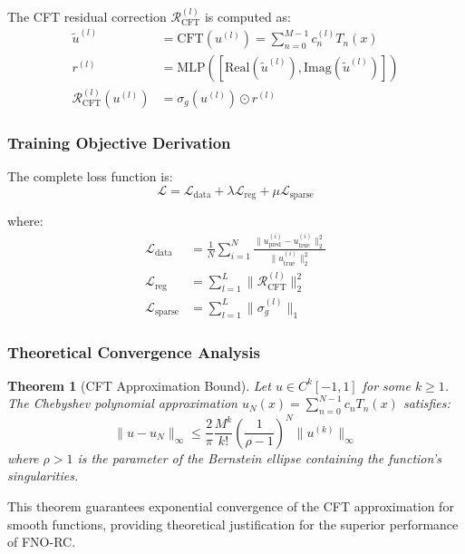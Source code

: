 \documentclass[11pt,twocolumn]{article}
\newtheorem{theorem}{Theorem}
\begin{document}
The CFT residual correction $\mathcal{R}_{\text{CFT}}^{(l)}$ is computed as:
\begin{align}
\tilde{u}^{(l)} &= \text{CFT}(u^{(l)}) = \sum_{n=0}^{M-1} c_n^{(l)} T_n(x) \\
r^{(l)} &= \text{MLP}\left( [\text{Real}(\tilde{u}^{(l)}), \text{Imag}(\tilde{u}^{(l)})] \right) \\
\mathcal{R}_{\text{CFT}}^{(l)}(u^{(l)}) &= \sigma_g(u^{(l)}) \odot r^{(l)}
\end{align}

\subsubsection{Training Objective Derivation}

The complete loss function is:
\begin{equation}
\mathcal{L} = \mathcal{L}_{\text{data}} + \lambda \mathcal{L}_{\text{reg}} + \mu \mathcal{L}_{\text{sparse}}
\end{equation}

where:
\begin{align}
\mathcal{L}_{\text{data}} &= \frac{1}{N} \sum_{i=1}^{N} \frac{\|u_{\text{pred}}^{(i)} - u_{\text{true}}^{(i)}\|_2^2}{\|u_{\text{true}}^{(i)}\|_2^2} \\
\mathcal{L}_{\text{reg}} &= \sum_{l=1}^{L} \|\mathcal{R}_{\text{CFT}}^{(l)}\|_2^2 \\
\mathcal{L}_{\text{sparse}} &= \sum_{l=1}^{L} \|\sigma_g^{(l)}\|_1
\end{align}

\subsubsection{Theoretical Convergence Analysis}

\begin{theorem}[CFT Approximation Bound]
Let $u \in C^k[-1,1]$ for some $k \geq 1$. The Chebyshev polynomial approximation $u_N(x) = \sum_{n=0}^{N-1} c_n T_n(x)$ satisfies:
\begin{equation}
\|u - u_N\|_\infty \leq \frac{2}{\pi} \frac{M^k}{k!} \left(\frac{1}{\rho-1}\right)^N \|u^{(k)}\|_\infty
\end{equation}
where $\rho > 1$ is the parameter of the Bernstein ellipse containing the function's singularities.
\end{theorem}

This theorem guarantees exponential convergence of the CFT approximation for smooth functions, providing theoretical justification for the superior performance of FNO-RC.
\end{document}
